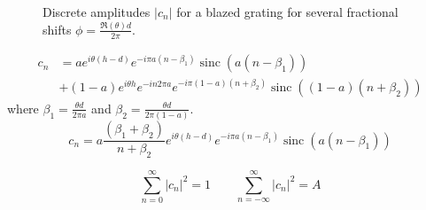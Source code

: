 \documentclass[12pt]{article}
\DeclareMathOperator{\sinc}{sinc} %
\begin{document}
\begin{figure}[H]
    \centering
    \caption{Discrete amplitudes $\lvert c_n\rvert$ for a blazed grating for several fractional shifts $\phi=\frac{\Re(\theta)d}{2\pi}$.}
\end{figure}
\begin{align}
    c_n &= a e^{i\theta (h-d)} e^{-i \pi a (n-\beta_1)} \sinc(a(n - \beta_1)) \\
    &+ (1-a) e^{i\theta h} e^{-i n 2\pi a} e^{-i \pi (1-a)(n+\beta_2)} \sinc((1-a)(n + \beta_2))
\end{align}
where $\beta_1 = \frac{\theta d}{2\pi a}$ and $\beta_2 = \frac{\theta d}{2\pi (1-a)}$.
\begin{equation}
    c_n = a \frac{(\beta_1 + \beta_2)}{n+\beta_2} e^{i\theta (h-d)} e^{-i\pi a (n-\beta_1)} \sinc(a(n-\beta_1))
\end{equation}

\begin{equation}
    \sum_{n=0}^\infty |c_n|^2 = 1 \qquad \sum_{n=-\infty}^\infty |c_n|^2 = A
\end{equation}
\end{document}

